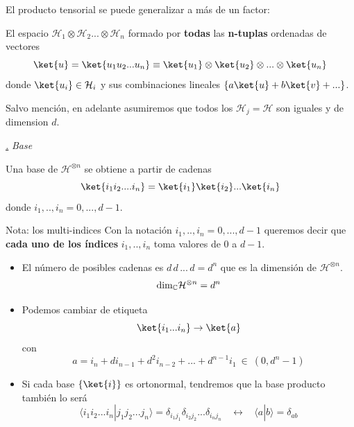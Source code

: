 \documentclass[a4paper,11pt]{book} %
\numberwithin{equation}{chapter}
\newcommand{\braket}[2]{\langle #1|#2\rangle}
\def\subsubiContadorIt{\par\addtocounter{subsubsection}{1}\underline{\it\thesubsubsection.}\hskip0.5cm \setcounter{subsubsubsectionIt}{0}}
\newcommand{\SubsubiIt}[1]{
		\subsubiContadorIt \textit{#1}
	}
\newcounter{subsubsubsectionIt}[subsubsection]
\begin{document}
El producto tensorial se puede generalizar a más de un factor:

\begin{mybox_gray2}{}
El espacio $\mathcal{H}_1\otimes \mathcal{H}_2 ... \otimes \mathcal{H}_n$ formado por \textbf{todas} las \textbf{n-tuplas} ordenadas de vectores 
	\begin{equation}
	\ket{u} = \ket{u_1u_2...u_n} \equiv\ket{u_1}\otimes\ket{u_2}\otimes ...\otimes \ket{u_n}
	\end{equation}
donde $\ket{u_i}\in \mathcal{H}_i$ y sus combinaciones lineales $\{ a\ket{u}+ b\ket{v} + ...\}$.
\end{mybox_gray2}

Salvo mención, en adelante asumiremos que todos los $\mathcal{H}_j=\mathcal{H}$ son iguales y de dimension $d$.


			\SubsubiIt{Base}

\begin{mybox_gray2}{}
Una base de $\mathcal{H}^{\otimes n}$ se obtiene a partir de cadenas 
	\begin{equation}
	\ket{i_1 i_2.... i_n} = 
\ket{i_1}\ket{i_2}  ... \ket{i_n}
	\end{equation} 
donde $i_1,..,i_n=0,...,d-1$. 
\end{mybox_gray2}

	\begin{mybox_blue}{Nota: los multi-indices}
	Con la notación $i_1,..,i_n=0,...,d-1$ queremos decir que \textbf{cada uno de los índices} $i_1,..,i_n$ toma valores de $0$ a $d-1$.
	\end{mybox_blue}

\begin{itemize}
	\item El número de posibles cadenas es $d\, d\, ... \, d = d^n$ que  es la dimensión de $\mathcal{H}^{\otimes n}$.
	\begin{equation}
	{\rm dim}_{\mathbb C} \mathcal{H}^{\otimes n} = d^n
	\end{equation}

	
	\item Podemos cambiar de etiqueta
		\begin{equation}
	 	\ket{i_1...i_n} \to \ket{a}
	 	\end{equation} 
	con
	\begin{equation}
	a = i_n + d i_{n-1} + d^2 i_{n-2}+...+d^{n-1} i_1~\in ~(0,d^n-1)
	\end{equation}

	
	\item Si cada base $\{\ket{i}\}$ es ortonormal, tendremos que la base producto también lo será
		\begin{equation}
		\braket{i_1 i_2... i_n}{j_1j_2...j_n} = \delta_{i_1j_1}\delta_{i_2j_2}...\delta_{i_nj_n} ~~~~\leftrightarrow ~~~~
\braket{a}{b} = \delta_{ab}
		\end{equation}
\end{itemize}
\end{document}
